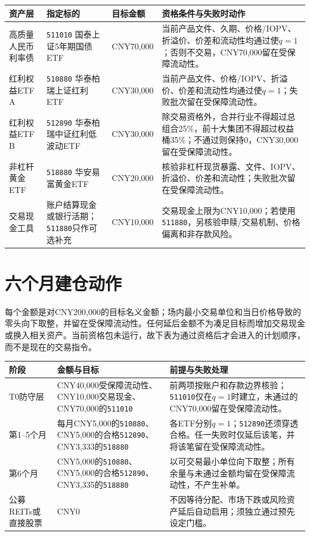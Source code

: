 \begin{exhibitbox}[指定模型标的]
\small
\begin{tabularx}{\exhibitboxwidth}{L{2.4cm}L{3.1cm}L{1.7cm}P}
\toprule
\textbf{资产层} & \textbf{指定标的} & \textbf{目标金额} & \textbf{资格条件与失败时动作} \\
\midrule
高质量人民币利率债 & \texttt{511010} 国泰上证5年期国债ETF & CNY70,000 & 当前产品文件、久期、价格/IOPV、折溢价、价差和流动性均通过使$q=1$；否则不交易，CNY70,000留在受保障流动性。 \\
红利权益ETF A & \texttt{510880} 华泰柏瑞上证红利ETF & CNY30,000 & 当前产品文件、价格/IOPV、折溢价、价差和流动性均通过使$q=1$；失败批次留在受保障流动性。 \\
红利权益ETF B & \texttt{512890} 华泰柏瑞中证红利低波动ETF & CNY30,000 & 除交易资格外，合并行业不得超过总组合25\%，前十大集团不得超过权益桶35\%；不通过则保持0，CNY30,000留在受保障流动性。 \\
非杠杆黄金ETF & \texttt{518880} 华安易富黄金ETF & CNY20,000 & 核验非杠杆现货暴露、文件、IOPV、折溢价、价差和流动性；失败批次留在受保障流动性。 \\
交易现金工具 & 账户结算现金或银行活期；\texttt{511880}只作可选补充 & CNY10,000 & 交易现金上限为CNY10,000；若使用\texttt{511880}，另核验申赎/交易机制、价格偏离和非存款风险。 \\
\bottomrule
\end{tabularx}
\end{exhibitbox}

\section{六个月建仓动作}

每个金额是对CNY200,000的目标名义金额；场内最小交易单位和当日价格导致的零头向下取整，并留在受保障流动性。任何延后金额不为凑足目标而增加交易现金或换入相关资产。当前资格包未运行，故下表为通过资格后才会进入的计划顺序，而不是现在的交易指令。

\begin{exhibitbox}[六个月模型建仓动作]
\small
\begin{tabularx}{\exhibitboxwidth}{L{2.5cm}P P}
\toprule
\textbf{阶段} & \textbf{金额与目标} & \textbf{前提与失败处理} \\
\midrule
T0防守层 & CNY40,000受保障流动性、CNY10,000交易现金、CNY70,000的\texttt{511010} & 前两项按账户和存款边界核验；\texttt{511010}仅在$q=1$时建立，未通过的CNY70,000留在受保障流动性。 \\
第1--5个月 & 每月CNY5,000的\texttt{510880}、CNY5,000的合格\texttt{512890}、CNY3,333的\texttt{518880} & 各ETF分别$q=1$；\texttt{512890}还须穿透合格。任一失败时仅延后该笔，并将该笔留在受保障流动性。 \\
第6个月 & CNY5,000的\texttt{510880}、CNY5,000的合格\texttt{512890}、CNY3,335的\texttt{518880} & 以可交易最小单位向下取整；所有余量与未通过金额均留在受保障流动性，不产生补单。 \\
公募REITs或直接股票 & CNY0 & 不因等待分配、市场下跌或风险资产延后自动启用；须独立通过预先设定门槛。 \\
\bottomrule
\end{tabularx}
\end{exhibitbox}

